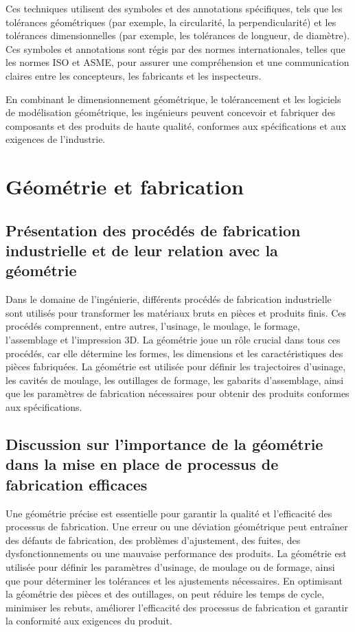 \documentclass{article}
\begin{document}
Ces techniques utilisent des symboles et des annotations spécifiques, tels que les tolérances géométriques (par exemple, la circularité, la perpendicularité) et les tolérances dimensionnelles (par exemple, les tolérances de longueur, de diamètre). Ces symboles et annotations sont régis par des normes internationales, telles que les normes ISO et ASME, pour assurer une compréhension et une communication claires entre les concepteurs, les fabricants et les inspecteurs.

En combinant le dimensionnement géométrique, le tolérancement et les logiciels de modélisation géométrique, les ingénieurs peuvent concevoir et fabriquer des composants et des produits de haute qualité, conformes aux spécifications et aux exigences de l'industrie.




\section{Géométrie et fabrication}

\subsection{Présentation des procédés de fabrication industrielle et de leur relation avec la géométrie}

Dans le domaine de l'ingénierie, différents procédés de fabrication industrielle sont utilisés pour transformer les matériaux bruts en pièces et produits finis. Ces procédés comprennent, entre autres, l'usinage, le moulage, le formage, l'assemblage et l'impression 3D. La géométrie joue un rôle crucial dans tous ces procédés, car elle détermine les formes, les dimensions et les caractéristiques des pièces fabriquées. La géométrie est utilisée pour définir les trajectoires d'usinage, les cavités de moulage, les outillages de formage, les gabarits d'assemblage, ainsi que les paramètres de fabrication nécessaires pour obtenir des produits conformes aux spécifications.

\subsection{Discussion sur l'importance de la géométrie dans la mise en place de processus de fabrication efficaces}

Une géométrie précise est essentielle pour garantir la qualité et l'efficacité des processus de fabrication. Une erreur ou une déviation géométrique peut entraîner des défauts de fabrication, des problèmes d'ajustement, des fuites, des dysfonctionnements ou une mauvaise performance des produits. La géométrie est utilisée pour définir les paramètres d'usinage, de moulage ou de formage, ainsi que pour déterminer les tolérances et les ajustements nécessaires. En optimisant la géométrie des pièces et des outillages, on peut réduire les temps de cycle, minimiser les rebuts, améliorer l'efficacité des processus de fabrication et garantir la conformité aux exigences du produit.
\end{document}
